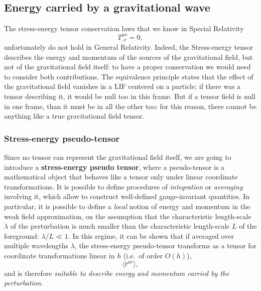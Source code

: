 \subsection{Energy carried by a gravitational wave}
The stress-energy tensor conservation laws that we know in Special Relativity
\[
    T^{\mu\nu}_{,\nu}=0,
\]
unfortunately do not hold in General Relativity.
Indeed, the Stress-energy tensor describes the energy and momentum of the sources of the gravitational field, but not of the gravitational field itself: to have a proper conservation we would need to consider both contributions.
The equivalence principle states that the effect of the gravitational field vanishes in a LIF centered on a particle; if there was a tensor describing it, it would be null too in this frame.
But if a tensor field is null in one frame, than it must be in all the other too: for this reason, there cannot be anything like a true gravitational field tensor.

\subsubsection{Stress-energy pseudo-tensor}
Since no tensor can represent the gravitational field itself, we are going to introduce a \textbf{stress-energy pseudo tensor}, where a pseudo-tensor is a mathematical object that behaves like a tensor only under linear coordinate transformations.
It is possible to define procedures of \textit{integration} or \textit{averaging} involving it, which allow to construct well-defined gauge-invariant quantities.
In particular, it is possible to define a \textit{local} notion of energy and momentum in the weak field approximation, on the assumption that the characteristic length-scale $\lambda$ of the perturbation is much smaller than the characteristic length-scale $L$ of the foreground: $\lambda/L\ll 1$.
In this regime, it can be shown that if averaged over multiple wavelengths $\lambda$, the stress-energy pseudo-tensor transforms as a tensor for coordinate transformations linear in $h$ (i.e.\ of order $O(h)$),
\[
    \langle t^{\mu\nu}\rangle,
\]
and is therefore \textit{suitable to describe energy and momentum carried by the perturbation}.


